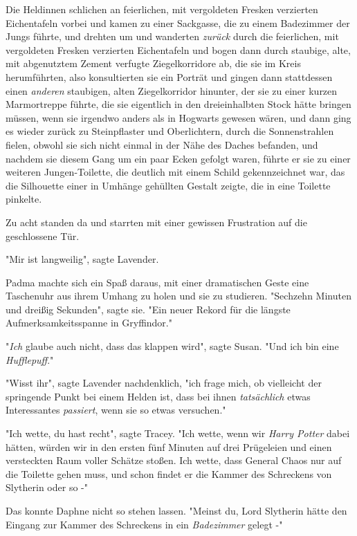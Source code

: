 {Die Heldinnen schlichen an feierlichen, mit vergoldeten Fresken verzierten Eichentafeln vorbei und kamen zu einer Sackgasse, die zu einem Badezimmer der Jungs führte, und drehten um und wanderten \emph{zurück} durch die feierlichen, mit vergoldeten Fresken verzierten Eichentafeln und bogen dann durch staubige, alte, mit abgenutztem Zement verfugte Ziegelkorridore ab, die sie im Kreis herumführten, also konsultierten sie ein Porträt und gingen dann stattdessen einen \emph{anderen} staubigen, alten Ziegelkorridor hinunter, der sie zu einer kurzen Marmortreppe führte, die sie eigentlich in den dreieinhalbten Stock hätte bringen müssen, wenn sie irgendwo anders als in Hogwarts gewesen wären, und dann ging es wieder zurück zu Steinpflaster und Oberlichtern, durch die Sonnenstrahlen fielen, obwohl sie sich nicht einmal in der Nähe des Daches befanden, und nachdem sie diesem Gang um ein paar Ecken gefolgt waren, führte er sie zu einer weiteren Jungen-Toilette, die deutlich mit einem Schild gekennzeichnet war, das die Silhouette einer in Umhänge gehüllten Gestalt zeigte, die in eine Toilette pinkelte.

Zu acht standen da und starrten mit einer gewissen Frustration auf die geschlossene Tür.

"Mir ist langweilig", sagte Lavender.

Padma machte sich ein Spaß daraus, mit einer dramatischen Geste eine Taschenuhr aus ihrem Umhang zu holen und sie zu studieren. "Sechzehn Minuten und dreißig Sekunden", sagte sie. "Ein neuer Rekord für die längste Aufmerksamkeitsspanne in Gryffindor."

"\emph{Ich} glaube auch nicht, dass das klappen wird", sagte Susan. "Und ich bin eine \emph{Hufflepuff}."

"Wisst ihr", sagte Lavender nachdenklich, "ich frage mich, ob vielleicht der springende Punkt bei einem Helden ist, dass bei ihnen \emph{tatsächlich} etwas Interessantes \emph{passiert}, wenn sie so etwas versuchen."

"Ich wette, du hast recht", sagte Tracey. "Ich wette, wenn wir \emph{Harry Potter} dabei hätten, würden wir in den ersten fünf Minuten auf drei Prügeleien und einen versteckten Raum voller Schätze stoßen. Ich wette, dass General Chaos nur auf die Toilette gehen muss, und schon findet er die Kammer des Schreckens von Slytherin oder so -"

Das konnte Daphne nicht so stehen lassen. "Meinst du, Lord Slytherin hätte den Eingang zur Kammer des Schreckens in ein \emph{Badezimmer} gelegt -"

}
